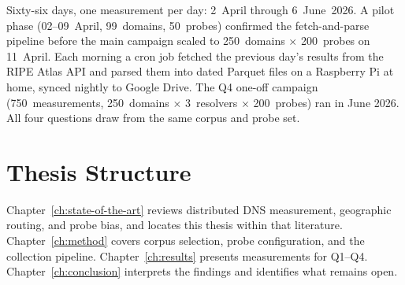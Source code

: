 Sixty-six days, one measurement per day: 2~April through 6~June~2026. A pilot phase (02--09~April, 99~domains, 50~probes) confirmed the fetch-and-parse pipeline before the main campaign scaled to 250~domains $\times$ 200~probes on 11~April. Each morning a cron job fetched the previous day's results from the RIPE Atlas \ac{API} and parsed them into dated Parquet files on a Raspberry Pi at home, synced nightly to Google Drive. The Q4 one-off campaign (750~measurements, 250~domains $\times$ 3~resolvers $\times$ 200~probes) ran in June 2026. All four questions draw from the same corpus and probe set.

\bigskip
\section{Thesis Structure}
\label{sec:1.4}

Chapter~\ref{ch:state-of-the-art} reviews distributed \ac{DNS} measurement, geographic routing, and probe bias, and locates this thesis within that literature. Chapter~\ref{ch:method} covers corpus selection, probe configuration, and the collection pipeline. Chapter~\ref{ch:results} presents measurements for Q1--Q4. Chapter~\ref{ch:conclusion} interprets the findings and identifies what remains open.
